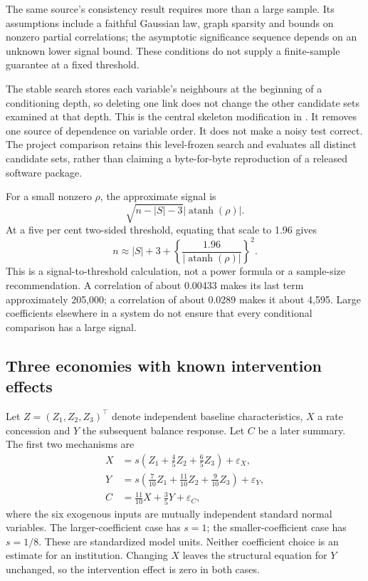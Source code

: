 The same source's consistency result requires more than a large sample. Its
assumptions include a faithful Gaussian law, graph sparsity and bounds on
nonzero partial correlations; the asymptotic significance sequence depends on
an unknown lower signal bound. These conditions do not supply a finite-sample
guarantee at a fixed threshold. \citep[Assumptions A1--A4 and Theorem 1,
pp.~619--620]{kalisch2007}

The stable search stores each variable's neighbours at the beginning of a
conditioning depth, so deleting one link does not change the other candidate
sets examined at that depth. This is the central skeleton modification in
\citet[Section 4.1, Algorithm 4.1 and Theorem 3]{exec13_latentr_colombo2014}. It removes
one source of dependence on variable order. It does not make a noisy test
correct. The project comparison retains this level-frozen search and evaluates
all distinct candidate sets, rather than claiming a byte-for-byte reproduction
of a released software package.

For a small nonzero $\rho$, the approximate signal is
\[
 \sqrt{n-|S|-3}|\operatorname{atanh}(\rho)|.
\]
At a five per cent two-sided threshold, equating that scale to 1.96 gives
\begin{equation}
 n\approx |S|+3+
 \left\{\frac{1.96}{|\operatorname{atanh}(\rho)|}\right\}^{2}.
 \label{closure30:signal-scale}
\end{equation}
This is a signal-to-threshold calculation, not a power formula or a sample-size
recommendation. A correlation of about 0.00433 makes its last term approximately
205,000; a correlation of about 0.0289 makes it about 4,595. Large coefficients
elsewhere in a system do not ensure that every conditional comparison has a
large signal.

\subsection{Three economies with known intervention effects}

Let $Z=(Z_1,Z_2,Z_3)^\top$ denote independent baseline characteristics,
$X$ a rate concession and $Y$ the subsequent balance response. Let $C$ be a
later summary. The first two mechanisms are
\begin{align}
 X&=s\left(Z_1+\frac45Z_2+\frac65Z_3\right)+\varepsilon_X,\\
 Y&=s\left(\frac7{10}Z_1+\frac{11}{10}Z_2+
                 \frac9{10}Z_3\right)+\varepsilon_Y,\\
 C&=\frac{11}{10}X+\frac35Y+\varepsilon_C,
 \label{closure30:sampling-economy}
\end{align}
where the six exogenous inputs are mutually independent standard normal
variables. The larger-coefficient case has $s=1$; the smaller-coefficient case
has $s=1/8$. These are standardized model units. Neither coefficient choice is
an estimate for an institution. Changing $X$ leaves the structural equation
for $Y$ unchanged, so the intervention effect is zero in both cases.

